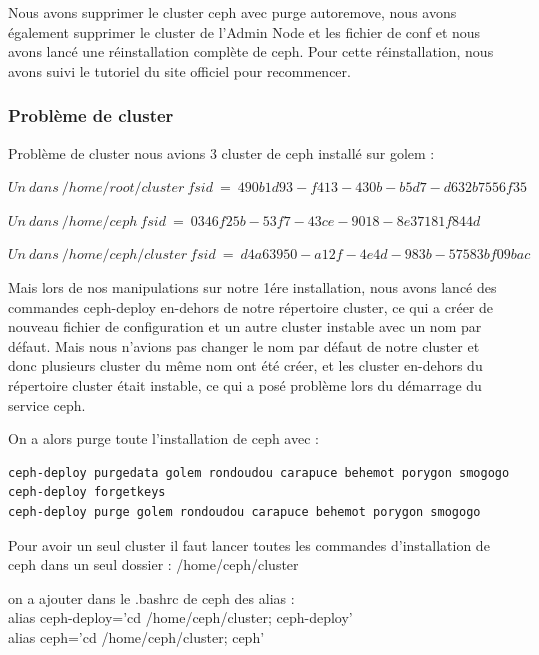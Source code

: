 \documentclass[12pt]{article}
\begin{document}
Nous avons supprimer le cluster ceph avec purge autoremove, nous avons également supprimer le cluster de l'Admin Node et les fichier de conf et nous avons lancé une réinstallation complète de ceph. Pour cette réinstallation, nous avons suivi le tutoriel du site officiel pour recommencer.
	\subsubsection{Problème de cluster}
	Problème de cluster nous avions 3 cluster de ceph installé sur golem :
	
 $ Un\ dans\ /home/root/cluster\ fsid\ =\ 490b1d93-f413-430b-b5d7-d632b7556f35$
	 
 $ Un\ dans\ /home/ceph\ fsid\ =\ 0346f25b-53f7-43ce-9018-8e37181f844d$
 
	 $ Un\ dans\ /home/ceph/cluster\ fsid\ =\ d4a63950-a12f-4e4d-983b-57583bf09bac$
	 
	 Mais lors de nos manipulations sur notre 1ére installation, nous avons lancé des commandes ceph-deploy en-dehors de notre répertoire cluster, ce qui a créer de nouveau fichier de configuration et un autre cluster instable avec un nom par défaut. Mais nous n'avions pas changer le nom par défaut de notre cluster et donc plusieurs cluster du même nom ont été créer, et les cluster en-dehors du répertoire cluster était instable, ce qui a posé problème lors du démarrage du service ceph.	

On a alors purge toute l'installation de ceph avec :
\begin{verbatim}
ceph-deploy purgedata golem rondoudou carapuce behemot porygon smogogo
ceph-deploy forgetkeys
ceph-deploy purge golem rondoudou carapuce behemot porygon smogogo
\end{verbatim}

Pour avoir un seul cluster il faut lancer toutes les commandes d'installation de ceph dans un seul dossier : /home/ceph/cluster

on a ajouter dans le .bashrc de ceph des alias :
\\ alias ceph-deploy='cd /home/ceph/cluster; ceph-deploy' 
\\ alias ceph='cd /home/ceph/cluster; ceph' 
\end{document}
